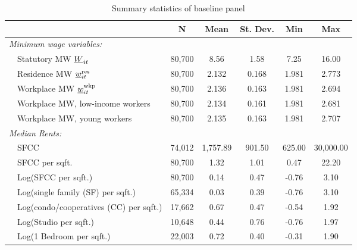 \begin{table}[hbt!] \centering
    \caption{Summary statistics of baseline panel}
    \label{tab:stats_est_panel}
    \begin{tabular}{@{}lccccc@{}}
        \toprule
                                          & \multicolumn{1}{c}{N} 
                                          & \multicolumn{1}{c}{Mean} 
                                          & \multicolumn{1}{c}{St. Dev.} 
                                          & \multicolumn{1}{c}{Min} 
                                          & \multicolumn{1}{c}{Max}                 \\ \midrule
        \textit{Minimum wage variables:}              &       &       &       &       &       \\
        $\quad$Statutory MW $\underline{W}_{it}$                & 80,700  & 8.56  & 1.58  & 7.25  & 16.00  \\
        $\quad$Residence MW $\underline{w}^{\text{res}}_{it}$         & 80,700  & 2.132  & 0.168  & 1.981  & 2.773  \\
        $\quad$Workplace MW $\underline{w}^{\text{wkp}}_{it}$         & 80,700  & 2.136  & 0.163  & 1.981  & 2.694  \\
        $\quad$Workplace MW, low-income workers       & 80,700  & 2.134  & 0.161  & 1.981  & 2.681  \\
        $\quad$Workplace MW, young workers            & 80,700  & 2.135  & 0.163  & 1.981  & 2.707  \\[.3em]
        \textit{Median Rents:}                        &       &       &       &       &       \\
        $\quad$SFCC                                   & 74,012  & 1,757.89  & 901.50  & 625.00  & 30,000.00  \\
        $\quad$SFCC per sqft.                         & 80,700  & 1.32  & 1.01  & 0.47  & 22.20  \\
        $\quad$Log(SFCC per sqft.)                    & 80,700  & 0.14  & 0.47  & -0.76  & 3.10  \\
        $\quad$Log(single family (SF) per sqft.)      & 65,334  & 0.03  & 0.39  & -0.76  & 3.10  \\
        $\quad$Log(condo/cooperatives (CC) per sqft.) & 17,662  & 0.67  & 0.47  & -0.54  & 1.92  \\
        $\quad$Log(Studio per sqft.)                  & 10,648  & 0.44  & 0.76  & -0.76  & 1.97  \\
        $\quad$Log(1 Bedroom per sqft.)               & 22,003  & 0.72  & 0.40  & -0.31  & 1.90  \\

\end{tabular}
\end{table}
